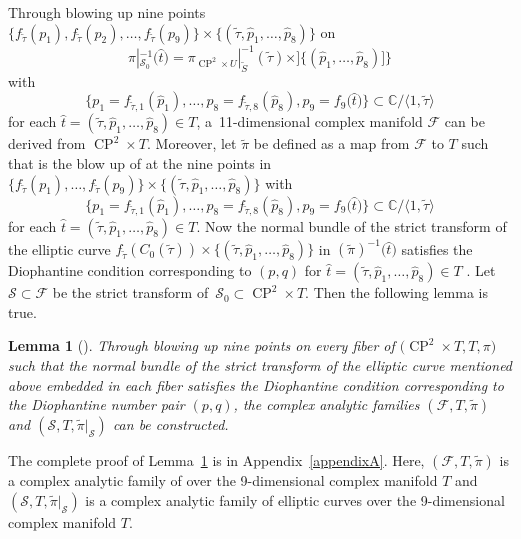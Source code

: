 \documentclass[pdftex]{sigma}
\numberwithin{equation}{section}
\newtheorem{Lemma}[Theorem]{Lemma}
\begin{document}
Through blowing up nine points $ \{ f_{\widetilde{\tau}}(p_1),f_{\widetilde{\tau}}(p_2),\dots ,f_{\widetilde{\tau}}(p_9) \} \times \{ (\widetilde{\tau},\hat{p}_1,\dots ,\hat{p}_8) \}$ on
\[\pi|^{-1}_{\mathcal{S}_0}\bigl(\hat{t}\bigr)=\pi_{\operatorname{CP}^2 \times U}|^{-1}_{\widetilde{S}}(\widetilde{\tau})\times ] \{ (\hat{p}_1,\dots ,\hat{p}_8) ] \}
\]
 with
 \[
 \big \{ p_1=f_{\widetilde{\tau},1}(\hat{p}_1),\dots ,p_8=f_{\widetilde{\tau},8}(\hat{p}_8),p_9=f_9\bigl(\hat{t}\bigr) \big \}\subset \mathbb{C}/ \langle 1, \widetilde{\tau} \rangle
 \]
 for each ${\hat{t}=(\widetilde{\tau},\hat{p}_1,\dots ,\hat{p}_8)\in T}$, a~11-dimensional complex manifold $\mathcal{F}$ can be derived from $\operatorname{CP}^2 \times T$. Moreover, let $\widetilde{\pi}$ be defined as a map from $\mathcal{F}$ to $T$ such that  is the blow up of  at the nine points in~$ { \{ f_{\widetilde{\tau}}(p_1),\dots ,f_{\widetilde{\tau}}(p_9) \} \times \{ (\widetilde{\tau},\hat{p}_1,\dots ,\hat{p}_8) \}}$ with
\[
\{ p_1=f_{\widetilde{\tau},1}(\hat{p}_1),\dots , p_8=f_{\widetilde{\tau},8}(\hat{p}_8),p_9=f_9\bigl(\hat{t}\bigr) \}\subset \mathbb{C}/ \langle 1, \widetilde{\tau} \rangle
\]
for each $\hat{t}=(\widetilde{\tau},\hat{p}_1,\dots ,\hat{p}_8)\in T$. Now the normal bundle of the strict transform of the elliptic curve $f_{\widetilde{\tau}}(C_0(\widetilde{\tau}))\times \{ (\widetilde{\tau}, \hat{p}_1,\dots ,\hat{p}_8) \}$ in $(\widetilde{\pi})^{-1}\bigl(\hat{t}\bigr)$ satisfies the Diophantine condition corresponding to $(p,q)$ for $\hat{t}=(\widetilde{\tau},\hat{p}_1,\dots ,\hat{p}_8)\in T$ \cite{Takayuki-Takato2}. Let $\mathcal{S} \subset \mathcal{F}$ be the strict transform of~${\mathcal{S}_0 \subset \operatorname{CP}^2 \times T}$. Then the following lemma is true.

\begin{Lemma}[{\cite{Takayuki-Takato1}}] \label{Lemma3.3}
 Through blowing up nine points on every fiber of \emph{$\bigl(\operatorname{CP}^2 \times T,T, \pi\bigr)$} such that the normal bundle of the strict transform of the elliptic curve mentioned above embedded in each fiber satisfies the Diophantine condition corresponding to the Diophantine number pair $(p,q)$, the complex analytic families \emph{$(\mathcal{F},T, \widetilde{\pi})$} and \emph{$(\mathcal{S},T, \widetilde{\pi}|_\mathcal{S})$} can be constructed.
\end{Lemma}

The complete proof of Lemma~\ref{Lemma3.3} is in Appendix~\ref{appendixA}. Here, $(\mathcal{F},T, \widetilde{\pi})$ is a complex analytic family of  over the 9-dimensional complex manifold $T$ and $(\mathcal{S},T, \widetilde{\pi}|_\mathcal{S})$ is a complex analytic family of elliptic curves over the 9-dimensional complex manifold $T$.
\end{document}
